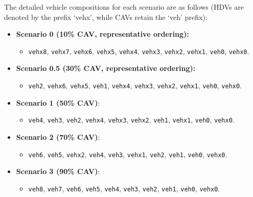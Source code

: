 \documentclass{ieeeaccess}
\begin{document}
The detailed vehicle compositions for each scenario are as follows (HDVs are denoted by the prefix `vehx', while CAVs retain the `veh' prefix):

\begin{itemize}
    \item \textbf{Scenario 0 (10\% CAV, representative ordering):}
    \begin{itemize}
        \item \texttt{vehx8}, \texttt{vehx7}, \texttt{vehx6}, \texttt{vehx5}, \texttt{vehx4}, \texttt{vehx3}, \texttt{vehx2}, \texttt{vehx1}, \texttt{veh0}, \texttt{vehx0}.
    \end{itemize}

    \item \textbf{Scenario 0.5 (30\% CAV, representative ordering):}
    \begin{itemize}
        \item \texttt{veh2}, \texttt{vehx6}, \texttt{vehx5}, \texttt{veh1}, \texttt{vehx4}, \texttt{vehx3}, \texttt{vehx2}, \texttt{vehx1}, \texttt{veh0}, \texttt{vehx0}.
    \end{itemize}

    \item \textbf{Scenario 1 (50\% CAV)}:
    \begin{itemize}
        \item \texttt{veh4}, \texttt{veh3}, \texttt{veh2}, \texttt{vehx4}, \texttt{vehx3}, \texttt{vehx2}, \texttt{veh1}, \texttt{vehx1}, \texttt{veh0}, \texttt{vehx0}.
    \end{itemize}

    \item \textbf{Scenario 2 (70\% CAV)}:
    \begin{itemize}
        \item \texttt{veh6}, \texttt{veh5}, \texttt{vehx2}, \texttt{veh4}, \texttt{veh3}, \texttt{vehx1}, \texttt{veh2}, \texttt{veh1}, \texttt{veh0}, \texttt{vehx0}.
    \end{itemize}

    \item \textbf{Scenario 3 (90\% CAV)}:
    \begin{itemize}
        \item \texttt{veh8}, \texttt{veh7}, \texttt{veh6}, \texttt{veh5}, \texttt{veh4}, \texttt{veh3}, \texttt{veh2}, \texttt{veh1}, \texttt{veh0}, \texttt{vehx0}.
    \end{itemize}
\end{itemize}
\end{document}
